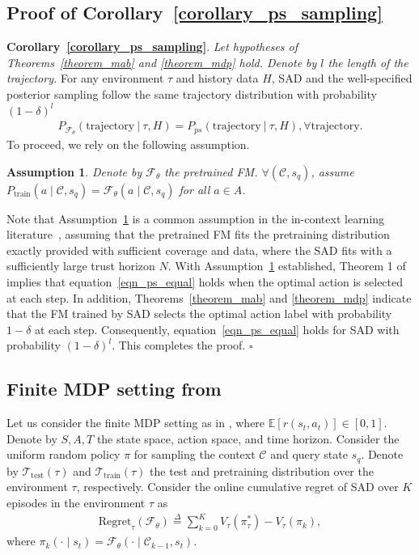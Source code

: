 \documentclass[10pt]{article}
\def\eqref#1{equation~\ref{#1}}
\newtheorem{assumption}{Assumption}
\newenvironment{myproof}{{\noindent\it Proof. }}{\hfill $\square$ \par}
\def\mbE{{\ensuremath{\mathbb E}}}
\def\ccalC{{\ensuremath{\mathcal C}}}
\def\ccalF{{\ensuremath{\mathcal F}}}
\def\ccalT{{\ensuremath{\mathcal T}}}
\begin{document}
\subsection{Proof of Corollary~\ref{corollary_ps_sampling}}
\label{appendix_omit_proof_corollary_ps_sampling}
\textbf{Corollary~\ref{corollary_ps_sampling}}.
\textit{
Let hypotheses of Theorems~\ref{theorem_mab}  and \ref{theorem_mdp} hold. Denote by $l$ the length of the trajectory.}
For any environment $\tau$ and history data $H$, SAD and the well-specified posterior sampling follow the same trajectory distribution with probability $(1-\delta)^l$
\begin{align}\label{eqn_ps_equal}
    P_{\ccalF_{\theta}} (\text{trajectory} \ | \ \tau, H) = P_{ps}(\text{trajectory}  \ | \  \tau, H), \forall \text{trajectory}.
\end{align}
\begin{myproof}
To proceed, we rely on the following assumption.
\begin{assumption}
\label{assumption_equality}
Denote by $\ccalF_{\theta}$ the pretrained FM. $\forall (\ccalC, s_q)$,
assume $P_{\text{train}}(a \mid \ccalC, s_q) = \ccalF_{\theta}( a \mid \ccalC, s_q)$ for all $a \in A$.
\end{assumption}
Note that Assumption~\ref{assumption_equality} is a common assumption in the in-context learning literature~\citep{xie2021explanation, lee2024supervised}, assuming that the pretrained FM fits the pretraining distribution exactly provided with sufficient coverage and data, where the SAD fits with a sufficiently large trust horizon $N$.
With Assumption~\ref{assumption_equality} established, Theorem 1 of \citep{lee2024supervised} implies that \eqref{eqn_ps_equal} holds when the optimal action is selected at each step.
In addition, Theorems~\ref{theorem_mab} and \ref{theorem_mdp} indicate that the FM trained by SAD selects the optimal action label with probability $1-\delta$ at each step. Consequently, \eqref{eqn_ps_equal} holds for SAD with probability $(1-\delta)^l$.
This completes the proof.
\end{myproof}
\subsection{Finite MDP setting from \cite{osband2013more}}
\label{appendix_finite_mdp_setting}
Let us consider the finite MDP setting as in \citep{osband2013more}, where $\mbE[r(s_t, a_t)] \in [0, 1]$. Denote by $S, A, T$ the state space, action space, and time horizon. Consider the uniform random policy $\pi$ for sampling the context $\ccalC$ and query state $s_q$.
Denote by ${\ccalT_{\text{test}}(\tau)} $ and ${\ccalT_{\text{train}}(\tau)}$ the test and pretraining distribution over the environment $\tau$, respectively.
Consider the online cumulative regret of SAD over $K$ episodes in the environment $\tau$ as
\begin{align}
    \text{Regret}_\tau(\ccalF_{\theta}) \overset{\Delta}{=} \sum_{k=0}^K V_\tau (\pi_\tau^*) - V_\tau(\pi_k),
\end{align}
where $\pi_k (\cdot \mid s_t) = \ccalF_{\theta}(\cdot \mid \ccalC_{k-1}, s_t)$.
\end{document}
